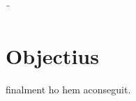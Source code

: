 \documentclass[a4paper,12pt]{book}
\renewcommand{\headrulewidth}{0pt}
\begin{document}


\frontmatter

\cleardoublepage

% 

\cleardoublepage
\setcounter{tocdepth}{2}
\renewcommand\contentsname{Índex de continguts}
\tableofcontents
\label{i:tableofcontents}

\mainmatter
\pagestyle{fancy}
\fancyhf{}
\fancyhead[LE,RO]{\leftmark}
\fancyfoot[LE,RO]{\thepage}
\renewcommand{\headrulewidth}{2pt}
\renewcommand{\footrulewidth}{1pt}


¨



% 
\chapter{Objectius}

finalment ho hem aconseguit.
\date{\today}
%
%
%
% 
%
% 
%
% 
%





\appendix
% 
%
% 
%
% 




\renewcommand\bibname{Bibliografia}


\label{b:bibliography}

\end{document}
